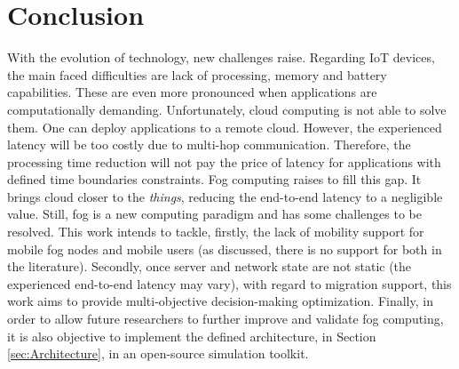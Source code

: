 \section{Conclusion}
\label{sec:Conclusion}
With the evolution of technology, new challenges raise. Regarding IoT devices, the main faced difficulties are lack of processing, memory and battery capabilities. These are even more pronounced when applications are computationally demanding. Unfortunately, cloud computing is not able to solve them. One can deploy applications to a remote cloud. However, the experienced latency will be too costly due to multi-hop communication. Therefore, the processing time reduction will not pay the price of latency for applications with defined time boundaries constraints. Fog computing raises to fill this gap. It brings cloud closer to the \textit{things}, reducing the end-to-end latency to a negligible value. Still, fog is a new computing paradigm and has some challenges to be resolved. This work intends to tackle, firstly, the lack of mobility support for mobile fog nodes and mobile users (as discussed, there is no support for both in the literature).
Secondly, once server and network state are not static (the experienced end-to-end latency may vary), with regard to migration support, this work aims to provide multi-objective decision-making optimization. Finally, in order to allow future researchers to further improve and validate fog computing, it is also objective to implement the defined architecture, in Section \ref{sec:Architecture}, in an open-source simulation toolkit.
